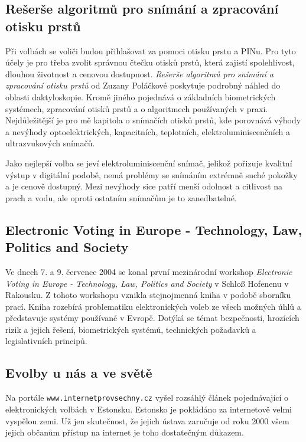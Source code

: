 \documentclass[11pt,twoside,a4paper]{book}
\begin{document}
\subsection{Rešerše algoritmů pro snímání a zpracování otisku prstů}

Při volbách se voliči budou přihlašovat za pomoci otisku prstu a PINu. Pro tyto účely je pro třeba zvolit správnou čtečku otisků prstů, která zajistí spolehlivost, dlouhou životnost a cenovou dostupnost. \textit{Rešerše algoritmů pro snímání a zpracování otisku prstů} \cite{art:polackova} od Zuzany Poláčkové poskytuje podrobný náhled do oblasti daktyloskopie. Kromě jiného pojednává o základních biometrických systémech, zpracování otisků prstů a o algoritmech používaných v praxi. Nejdůležitější je pro mě kapitola o snímačích otisků prstů, kde porovnává výhody a nevýhody optoelektrických, kapacitních, teplotních, elektroluminiscenčních a ultrazvukových snímačů.

Jako nejlepší volba se jeví elektroluminiscenční snímač, jelikož pořizuje kvalitní výstup v digitální podobě, nemá problémy se snímáním extrémně suché pokožky a je cenově dostupný. Mezi nevýhody sice patří menší odolnost a citlivost na prach a vodu, ale oproti ostatním snímačům je to zanedbatelné.

\subsection{Electronic Voting in Europe - Technology, Law, Politics and Society}

Ve dnech 7. a 9. července 2004 se konal první mezinárodní workshop \textit{Electronic Voting in Europe - Technology, Law, Politics and Society} \cite{book:prosser} v Schloß Hofenenu v Rakousku. Z tohoto workshopu vznikla stejnojmenná kniha v podobě sborníku prací. Kniha rozebírá problematiku elektronických voleb ze všech možných úhlů a představuje systémy používané v Evropě. Dotýká se témat bezpečnosti, hrozících rizik a jejich řešení, biometrických systémů, technických požadavků a legislativních principů.

\subsection{Evolby u nás a ve světě}

Na portále \texttt{www.internetprovsechny.cz} vyšel rozsáhlý článek \cite{www:estonsko} pojednávající o elektronických volbách v Estonsku. Estonsko je pokládáno za internetově velmi vyspělou zemi. Už jen skutečnost, že jejich ústava zaručuje od roku 2000 všem jejich občanům přístup na internet je toho dostatečným důkazem.
\end{document}
